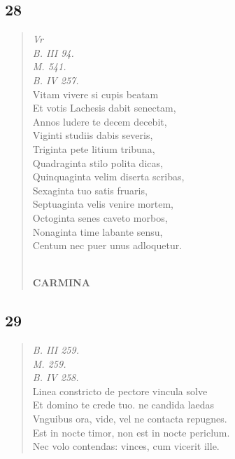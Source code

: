 \documentclass[11pt, a4paper]{report}
\begin{document}
            \subsection*{28}
      \begin{verse}
      \textit{Vr} \\ \textit{B. III 94.} \\ \textit{M. 541.} \\ \textit{B. IV 257.} \\ Vitam vivere si cupis beatam \\ Et votis Lachesis dabit senectam, \\ Annos ludere te decem decebit, \\ Viginti studiis dabis severis, \\ Triginta pete litium tribuna, \\ Quadraginta stilo polita dicas, \\ Quinquaginta velim diserta scribas, \\ Sexaginta tuo satis fruaris, \\ Septuaginta velis venire mortem, \\ Octoginta senes caveto morbos, \\ Nonaginta time labante sensu, \\ Centum nec puer unus adloquetur. \\ 
        ﻿\pagebreak 
    \begin{center} \textbf{CARMINA} \end{center} \marginpar{[100]} 
      \end{verse}
  
            \subsection*{29}
      \begin{verse}
      \textit{B. III 259.} \\ \textit{M. 259.} \\ \textit{B. IV 258.} \\ Linea constricto de pectore vincula solve \\ Et domino te crede tuo. ne candida laedas \\ Vnguibus ora, vide, vel ne contacta repugnes. \\ Est in nocte timor, non est in nocte periclum. \\ Nec volo contendas: vinces, cum vicerit ille. \\ 
      \end{verse}
  
\end{document}
